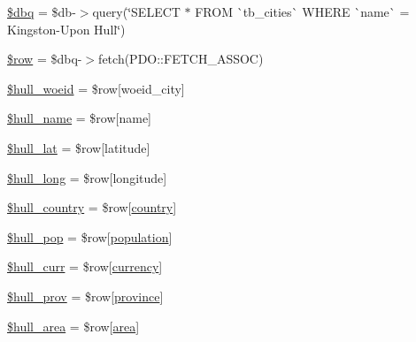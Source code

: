 \begin{DoxyCompactItemize}
\item 
\mbox{\hyperlink{index_8php_ab76933014035168a37e7e525ca8fbabe}{\$dbq}} = \$db-\/$>$query(\char`\"{}S\+E\+L\+E\+CT $\ast$ F\+R\+OM \`{}tb\+\_\+cities\`{} W\+H\+E\+RE \`{}name\`{} = \textquotesingle{}Kingston-\/Upon Hull\textquotesingle{}\char`\"{})
\item 
\mbox{\hyperlink{index_8php_aa1d731aa570613e5bcff831bb10e9b87}{\$row}} = \$dbq-\/$>$fetch(P\+D\+O\+::\+F\+E\+T\+C\+H\+\_\+\+A\+S\+S\+OC)
\item 
\mbox{\hyperlink{index_8php_a0255f88ae7eba38efbea0defdb8268a2}{\$hull\+\_\+woeid}} = \$row\mbox{[}\textquotesingle{}woeid\+\_\+city\textquotesingle{}\mbox{]}
\item 
\mbox{\hyperlink{index_8php_a5152ab3c5de633a3e7e5620ac57cf288}{\$hull\+\_\+name}} = \$row\mbox{[}\textquotesingle{}name\textquotesingle{}\mbox{]}
\item 
\mbox{\hyperlink{index_8php_a579767912e585d5819aa7bfe22e174f8}{\$hull\+\_\+lat}} = \$row\mbox{[}\textquotesingle{}latitude\textquotesingle{}\mbox{]}
\item 
\mbox{\hyperlink{index_8php_af542f209855ac8d02cd14c494f6ea9c9}{\$hull\+\_\+long}} = \$row\mbox{[}\textquotesingle{}longitude\textquotesingle{}\mbox{]}
\item 
\mbox{\hyperlink{index_8php_afba36b1379b54ac2b75e704c548b3f2c}{\$hull\+\_\+country}} = \$row\mbox{[}\textquotesingle{}\mbox{\hyperlink{index_8php_a0f0752705301c982dc8994ebc993e6e9}{country}}\textquotesingle{}\mbox{]}
\item 
\mbox{\hyperlink{index_8php_a009564d1c0613f4835396733f31920c0}{\$hull\+\_\+pop}} = \$row\mbox{[}\textquotesingle{}\mbox{\hyperlink{index_8php_aa78fa356925cd3f67d485c4d6846202b}{population}}\textquotesingle{}\mbox{]}
\item 
\mbox{\hyperlink{index_8php_a0a1e0de1e05cca55159a2ce410ea2ac9}{\$hull\+\_\+curr}} = \$row\mbox{[}\textquotesingle{}\mbox{\hyperlink{index_8php_abd84e0698c321abdbf211d5b8425d0b5}{currency}}\textquotesingle{}\mbox{]}
\item 
\mbox{\hyperlink{index_8php_a5a22018a71078063c322b9d9c28b248e}{\$hull\+\_\+prov}} = \$row\mbox{[}\textquotesingle{}\mbox{\hyperlink{index_8php_a38d70414c65575df5643ad4296c9db2e}{province}}\textquotesingle{}\mbox{]}
\item 
\mbox{\hyperlink{index_8php_a4acd88460885f0c986cb80568d4635f3}{\$hull\+\_\+area}} = \$row\mbox{[}\textquotesingle{}\mbox{\hyperlink{index_8php_a5198216176428aa2303311f956213f33}{area}}\textquotesingle{}\mbox{]}
\item 

\end{DoxyCompactItemize}
